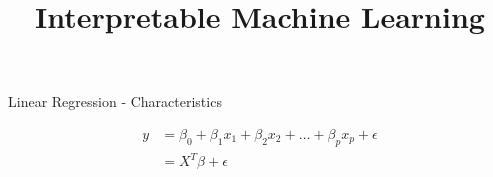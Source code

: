 \documentclass[11pt,compress,t,notes=noshow, aspectratio=169, xcolor=table]{beamer}
\title{Interpretable Machine Learning}
\date{}
\begin{document}
\newcommand{\titlefigure}{figure/whitebox}
\newcommand{\learninggoals}{
\item What characteristics do different interpretable models have?
\item How can we interpret these models?
\item Examples for different interpretable models.}





\begin{frame}[c]{Linear Regression - Characteristics}

\begin{align*}
y &= \beta_0 + \beta_1 x_1 + \beta_2 x_2 + \dots + \beta_p x_p + \epsilon \\
 &= X^T\beta + \epsilon
\end{align*}


\end{frame}
\end{document}
